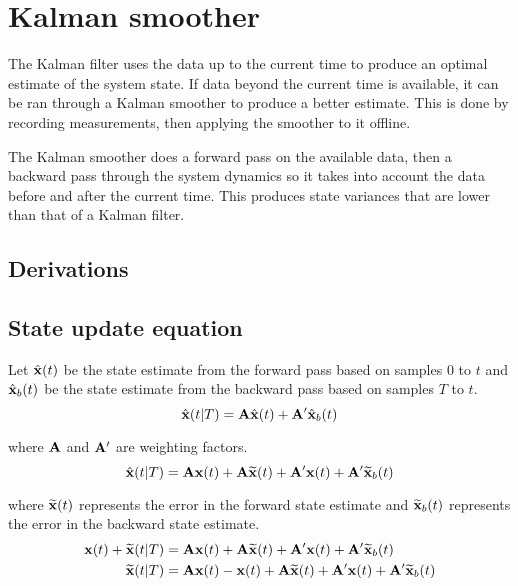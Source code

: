 \section{Kalman smoother}

The Kalman filter uses the data up to the current time to produce an optimal
estimate of the system \gls{state}. If data beyond the current time is
available, it can be ran through a Kalman smoother to produce a better estimate.
This is done by recording measurements, then applying the smoother to it
offline.

The Kalman smoother does a forward pass on the available data, then a backward
pass through the system dynamics so it takes into account the data before and
after the current time. This produces \gls{state} variances that are lower than
that of a Kalman filter.

\subsection{Derivations}

\subsection{State update equation}

Let $\hat{\mathbf{x}}(t)$ be the state estimate from the forward pass based on
samples $0$ to $t$ and $\hat{\mathbf{x}}_b(t)$ be the state estimate from the
backward pass based on samples $T$ to $t$.
\begin{equation}
  \hat{\mathbf{x}}(t|T) = \mathbf{A}\hat{\mathbf{x}}(t) + \mathbf{A}'\hat{\mathbf{x}}_b(t)
    \label{eq:ks_xhat}
\end{equation}

where $\mathbf{A}$ and $\mathbf{A}'$ are weighting factors.
\begin{equation*}
  \hat{\mathbf{x}}(t|T) = \mathbf{A}\mathbf{x}(t) + \mathbf{A}\widetilde{\mathbf{x}}(t) +
    \mathbf{A}'\mathbf{x}(t) + \mathbf{A}'\widetilde{\mathbf{x}}_b(t)
\end{equation*}

where $\widetilde{\mathbf{x}}(t)$ represents the error in the forward state
estimate and $\widetilde{\mathbf{x}}_b(t)$ represents the error in the backward
state estimate.
\begin{align*}
  \mathbf{x}(t) + \widetilde{\mathbf{x}}(t|T) &= \mathbf{A}\mathbf{x}(t) +
    \mathbf{A}\widetilde{\mathbf{x}}(t) + \mathbf{A}'\mathbf{x}(t) +
    \mathbf{A}'\widetilde{\mathbf{x}}_b(t) \\
  \widetilde{\mathbf{x}}(t|T) &= \mathbf{A}\mathbf{x}(t) - \mathbf{x}(t) +
    \mathbf{A}\widetilde{\mathbf{x}}(t) + \mathbf{A}'\mathbf{x}(t) +
    \mathbf{A}'\widetilde{\mathbf{x}}_b(t)
\end{align*}

